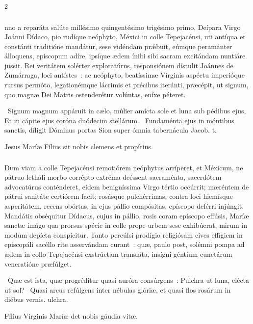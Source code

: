 \documentclass[9pt,twoside]{extarticle}
\begin{document}
\begin{multicols}{2}
\subsubsection*{\center {}}
nno a reparáta salúte millésimo quingentésimo trigésimo primo, Deípara Virgo Joánni Dídaco, pio rudíque neóphyto, Méxici in colle Tepejacénsi, uti antíqua et constánti traditióne mandátur, sese vidéndam prǽbuit, eúmque peramánter álloquens, epíscopum adíre, ipsíque ædem ínibi sibi sacram excitándam nuntiáre jussit. Rei veritátem solérter exploratúrus, responsiónem dístulit Joánnes de Zumárraga, loci antístes~: ac neóphyto, beatíssimæ Vírginis aspéctu imperióque rursus permóto, legationémque lácrimis et précibus iteránti, præcépit, ut signum, quo magnæ Dei Matris ostenderétur volúntas, eníxe péteret.

\begin{tightlist}{}
\item {}~Signum magnum appáruit in cælo, múlier amícta sole et luna sub pédibus ejus, \textred{*} Et in cápite ejus coróna duódecim stellárum.
~Fundaménta ejus in móntibus sanctis, díligit Dóminus portas Sion super ómnia tabernácula Jacob. t.
\item {\small {} Jesus Maríæ Fílius sit nobis clemens et propítius.}
\end{tightlist}

\subsubsection*{\center {}}
\lettrine{D}um viam a colle Tepejacénsi remotiórem neóphytus arríperet, et Méxicum, ne pátruo letháli morbo corrépto extréma deéssent sacraménta, sacerdótem advocatúrus conténderet, eídem benigníssima Virgo tértio occúrrit; mæréntem de pátrui sanitáte certiórem facit; rosásque pulchérrimas, contra loci hiemísque asperitátem, recens obórtas, in ejus pállio compósitas, epíscopo deférri injúngit. Mandátis obséquitur Dídacus, cujus in pállio, rosis coram epíscopo effúsis, Maríæ sanctæ imágo qua prorsus spécie in colle prope urbem sese exhibúerat, mirum in modum depícta conspícitur. Tanto percúlsi prodígio religiósam cives effígiem in episcopáli sacéllo rite asservándam curant~: quæ, paulo post, solémni pompa ad ædem in collo Tepejacénsi exstrúctam transláta, insígni géntium cunctárum veneratióne præfúlget.

\begin{tightlist}{}
\item {}~Quæ est ista, quæ progréditur quasi auróra consúrgens~: \textred{*} Pulchra ut luna, elécta ut sol?
~Quasi arcus refúlgens inter nébulas glóriæ, et quasi flos rosárum in diébus vernis. ulchra.
\item {\small {} Fílius Vírginis Maríæ det nobis gáudia vitæ.}
\end{tightlist}


\end{multicols}
\end{document}
